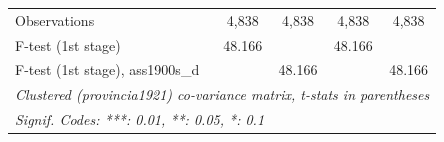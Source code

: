 \begin{tabular}{lcccc}
   Observations                     & 4,838                          & 4,838            & 4,838                          & 4,838\\  
   F-test (1st stage)               & 48.166                         &                  & 48.166                         & \\  
   F-test (1st stage), ass1900s\_d  &                                & 48.166           &                                & 48.166\\  
   \midrule \midrule
   \multicolumn{5}{l}{\emph{Clustered (provincia1921) co-variance matrix, t-stats in parentheses}}\\
   \multicolumn{5}{l}{\emph{Signif. Codes: ***: 0.01, **: 0.05, *: 0.1}}\\
\end{tabular}
\par\endgroup


